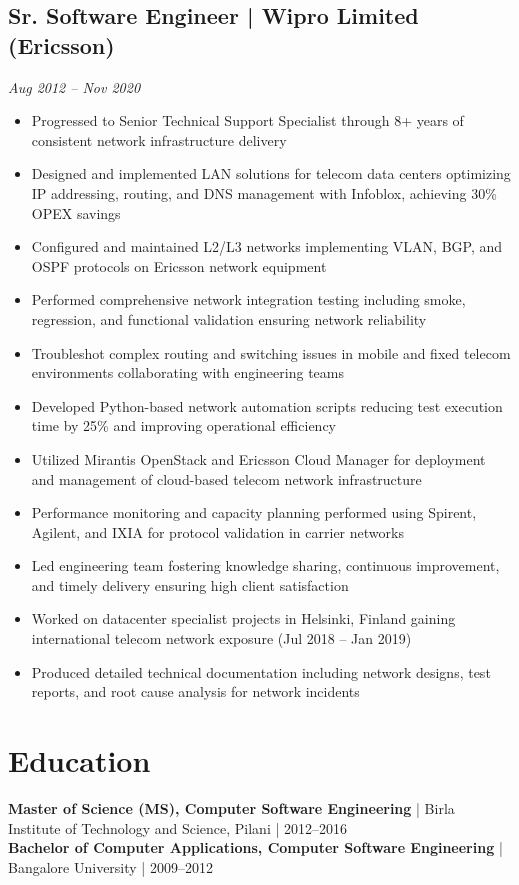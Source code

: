 \documentclass[10pt,a4paper]{article}
\begin{document}
\subsection*{Sr. Software Engineer | Wipro Limited (Ericsson)}
\hfill \textit{Aug 2012 -- Nov 2020}
\begin{itemize}
    \item Progressed to Senior Technical Support Specialist through 8+ years of consistent network infrastructure delivery
    \item Designed and implemented LAN solutions for telecom data centers optimizing IP addressing, routing, and DNS management with Infoblox, achieving 30\% OPEX savings
    \item Configured and maintained L2/L3 networks implementing VLAN, BGP, and OSPF protocols on Ericsson network equipment
    \item Performed comprehensive network integration testing including smoke, regression, and functional validation ensuring network reliability
    \item Troubleshot complex routing and switching issues in mobile and fixed telecom environments collaborating with engineering teams
    \item Developed Python-based network automation scripts reducing test execution time by 25\% and improving operational efficiency
    \item Utilized Mirantis OpenStack and Ericsson Cloud Manager for deployment and management of cloud-based telecom network infrastructure
    \item Performance monitoring and capacity planning performed using Spirent, Agilent, and IXIA for protocol validation in carrier networks
    \item Led engineering team fostering knowledge sharing, continuous improvement, and timely delivery ensuring high client satisfaction
    \item Worked on datacenter specialist projects in Helsinki, Finland gaining international telecom network exposure (Jul 2018 -- Jan 2019)
    \item Produced detailed technical documentation including network designs, test reports, and root cause analysis for network incidents
\vspace{2pt}
\end{itemize}

\vspace{2pt}
\section*{Education}
\textbf{Master of Science (MS), Computer Software Engineering} | Birla Institute of Technology and Science, Pilani | 2012--2016\\
\textbf{Bachelor of Computer Applications, Computer Software Engineering} | Bangalore University | 2009--2012
\end{document}
